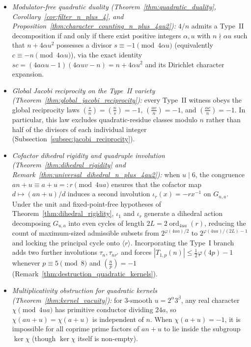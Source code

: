 \documentclass[11pt, a4paper]{article}
\theoremstyle{plain}
\theoremstyle{definition}
\newcommand{\leg}[2]{\left(\frac{#1}{#2}\right)}
\begin{document}
\begin{itemize}
    \item \emph{Modulator-free quadratic duality (Theorem~\ref{thm:quadratic_duality}, Corollary~\ref{cor:filter_n_plus_4}, and Proposition~\ref{thm:character_counting_n_plus_4au2}):} $4/n$ admits a Type~II decomposition if and only if there exist positive integers $\alpha,u$ with $n\nmid\alpha u$ such that $n+4\alpha u^{2}$ possesses a divisor $s\equiv-1\pmod{4\alpha u}$ (equivalently $c\equiv-n\pmod{4\alpha u}$), via the exact identity $sc=(4a\alpha u-1)(4\alpha uv-n)=n+4\alpha u^{2}$ and its Dirichlet character expansion.
    \item \emph{Global Jacobi reciprocity on the Type~II variety (Theorem~\ref{thm:global_jacobi_reciprocity}):} every Type~II witness obeys the global reciprocity laws $\leg{s}{n}=\leg{n}{s}=-1$, $\leg{uv}{n}=-1$, and $\leg{\alpha c}{n}=-1$. In particular, this law excludes quadratic-residue classes modulo $n$ rather than half of the divisors of each individual integer (Subsection~\ref{subsec:jacobi_reciprocity}).
    \item \emph{Cofactor dihedral rigidity and quadruple involution (Theorem~\ref{thm:dihedral_rigidity} and Remark~\ref{thm:universal_dihedral_n_plus_4au2}):} when $u\mid 6$, the congruence $an+u\equiv a+u=:r\pmod{4ua}$ ensures that the cofactor map $d\mapsto(an+u)/d$ induces a second involution $\iota_r(x)=-r x^{-1}$ on $G_{u,a}$. Under the unit and fixed-point-free hypotheses of Theorem~\ref{thm:dihedral_rigidity}, $\iota_1$ and $\iota_r$ generate a dihedral action decomposing $G_{u,a}$ into even cycles of length $2L=2\operatorname{ord}_{4ua}(r)$, reducing the count of maximum-sized admissible subsets from $2^{\varphi(4ua)/2}$ to $2^{\varphi(4ua)/(2L)-1}$ and locking the principal cycle onto $\langle r\rangle$. Incorporating the Type~I branch adds two further involutions $\tau_n,\tau_{nr'}$ and forces $|T_{1,p}(n)|\le\frac12\varphi(4p)-1$ whenever $p\equiv5\pmod 8$ and $\leg{n}{p}=-1$ (Remark~\ref{thm:destruction_quadratic_kernels}).
    \item \emph{Multiplicativity obstruction for quadratic kernels (Theorem~\ref{thm:kernel_vacuity}):} for $3$-smooth $u=2^{\alpha}3^{\beta}$, any real character $\chi\pmod{4ua}$ has primitive conductor dividing $24a$, so $\chi(an+u)=\chi(a+u)$ is independent of $n$. When $\chi(a+u)=-1$, it is impossible for all coprime prime factors of $an+u$ to lie inside the subgroup $\ker\chi$ (though $\ker\chi$ itself is non-empty).

\end{itemize}
\end{document}

